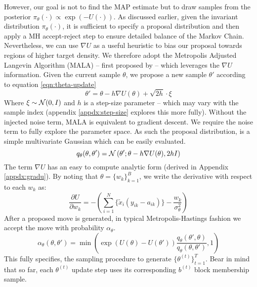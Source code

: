 However, our goal is not to find the MAP estimate but to draw samples from the posterior $\pi_\theta(\cdot) \propto \exp(-U(\cdot))$. As discussed earlier, given the invariant distribution $\pi_\theta(\cdot)$, it is sufficient to specify a proposal distribution and then apply a MH accept-reject step to ensure detailed balance of the Markov Chain. Nevertheless, we can use $\nabla U$ as a useful heuristic to bias our proposal towards regions of higher target density. We therefore adopt the Metropolis Adjusted Langevin Algorithm (MALA) -- first proposed by \citet{mala-tweedie} -- which leverages the $\nabla U$ information. Given the current sample $\theta$, we propose a new sample $\theta'$ according to equation \ref{eqn:theta-update}
%
\begin{equation}
	\theta' = \theta - h \nabla U(\theta) + \sqrt{2h} \cdot \xi
	\label{eqn:theta-update}
\end{equation}
%
Where $\xi \sim \mathcal{N}(0, I)$ and $h$ is a step-size parameter -- which may vary with the sample index (appendix \ref{appdx:step-size} explores this more fully). Without the injected noise term, MALA is equivalent to gradient descent. We require the noise term to fully explore the parameter space. As such the proposal distribution, is a simple multivariate Gaussian which can be easily evaluated.
%
\begin{equation}
	q_\theta(\theta, \theta') = \mathcal{N} \left( \theta' ; \theta - h \nabla U(\theta), 2h I \right)
\end{equation}
%
The term $\nabla U$ has an easy to compute analytic form (derived in Appendix \ref{appdx:gradu}). By noting that $\theta = \{w_k\}_{k=1}^{B}$, we write the derivative with respect to each $w_k$ as:
%
\begin{equation}
	\frac{\partial U}{\partial w_k} = - \left( \sum_{i=1}^{N} \Big\{ \tilde{x}_i (y_{ik} - a_{ik}) \Big\} - \frac{w_k}{\sigma_\theta^2} \right)
	\label{eqn:U-derivative}
\end{equation}
%
After a proposed move is generated, in typical Metropolis-Hastings fashion we accept the move with probability $\alpha_\theta$.
%
\begin{equation}
	\alpha_\theta(\theta, \theta') = \min \left( 
	\exp \left( U(\theta) - U(\theta')\right)
	\frac{ 
		q_\theta(\theta', \theta)
	}{
		q_\theta(\theta, \theta')
	} 
	, 1 \right)
\end{equation}
%
This fully specifies, the sampling procedure to generate $\{\theta^{(t)}\}_{t=1}^T$. Bear in mind that so far, each $\theta^{(t)}$ update step uses its corresponding $b^{(t)}$ block membership sample.

